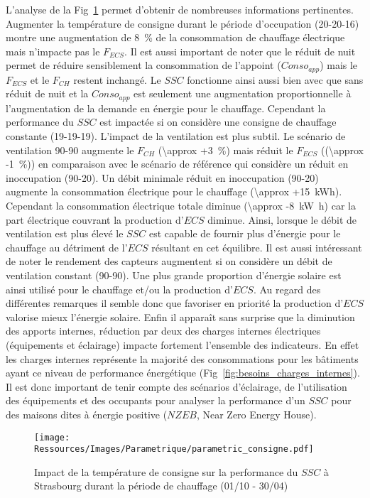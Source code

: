 L’analyse de la Fig~\ref{fig:impact_temp_consigne} permet d’obtenir de nombreuses
informations pertinentes. Augmenter la température de consigne durant le période
d’occupation (20-20-16) montre une augmentation de \SI{8}{\percent} de la consommation de
chauffage électrique mais n’impacte pas le $F_{ECS}$. Il est aussi important de noter que
le réduit de nuit permet de réduire sensiblement la consommation de l’appoint ($Conso_{app}$) mais le
$F_{ECS}$ et le  $F_{CH}$ restent inchangé. Le $SSC$ fonctionne ainsi aussi bien avec que
sans réduit de nuit et la $Conso_{app}$ est seulement une augmentation
proportionnelle à l’augmentation de la demande en énergie pour le chauffage. Cependant la
performance du $SSC$ est impactée si on considère une consigne de chauffage constante
(19-19-19). L’impact de la ventilation est plus subtil. Le scénario de ventilation 90-90
augmente le $F_{CH}$ (\SI{\approx +3}{\percent}) mais réduit le $F_{ECS}$
((\SI{\approx -1}{\percent})) en comparaison avec le scénario de référence qui considère un
réduit en inoccupation (90-20). Un débit minimale réduit en inoccupation (90-20) augmente
la consommation électrique pour le chauffage (\SI{\approx +15}{kWh}). Cependant la
consommation électrique totale diminue (\SI{\approx -8}{\kilo\watt\hour}) car la part
électrique couvrant la production d’$ECS$ diminue. Ainsi, lorsque le débit de ventilation
est plus élevé le $SSC$ est capable de fournir plus d’énergie pour le chauffage au
détriment de l’$ECS$ résultant en cet équilibre. Il est aussi intéressant de noter le
rendement des capteurs augmentent si on considère un débit de ventilation constant
(90-90). Une plus grande proportion d’énergie solaire est ainsi utilisé pour le chauffage
et/ou la production d’$ECS$. Au regard des différentes remarques il semble donc que
favoriser en priorité la production d’$ECS$ valorise mieux l’énergie solaire. Enfin il
apparaît sans surprise que la diminution des apports internes, réduction par deux des
charges internes électriques (équipements et éclairage) impacte fortement l’ensemble des
indicateurs. En effet les charges internes représente la majorité des consommations pour
les bâtiments ayant ce niveau de performance énergétique (Fig~\ref{fig:besoins_charges_internes}).
Il est donc important de tenir compte des scénarios d’éclairage, de l’utilisation des équipements
et des occupants pour analyser la performance d’un $SSC$ pour des maisons dites à énergie positive
($NZEB$, Near Zero Energy House).

\begin{figure}
    \begin{center}
        \texttt{[image: Ressources/Images/Parametrique/parametric\_consigne.pdf]}
    \end{center}
    \caption{Impact de la température de consigne sur la performance
             du $SSC$ à Strasbourg durant la période de chauffage (01/10 - 30/04)
             \label{fig:impact_temp_consigne}}
\end{figure}

